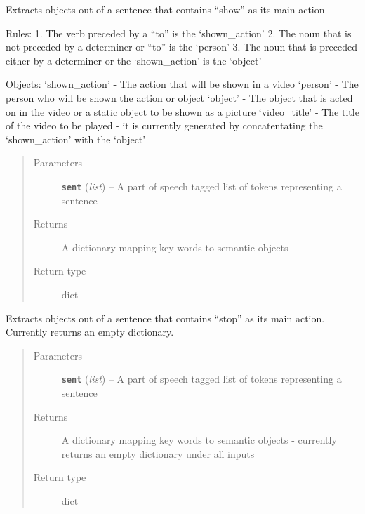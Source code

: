 \documentclass[letterpaper,10pt,english]{sphinxmanual}
\begin{document}
\begin{fulllineitems}
\label{extractor:interpreter.extractor.object_dict_show}
Extracts objects out of a sentence that contains ``show'' as its main action

Rules:
1. The verb preceded by a ``to'' is the `shown\_action'
2. The noun that is not preceded by a determiner or ``to'' is the `person'
3. The noun that is preceded either by a determiner or the `shown\_action' is the `object'

Objects:
`shown\_action' - The action that will be shown in a video
`person' - The person who will be shown the action or object
`object' - The object that is acted on in the video or a static object to be shown as a picture
`video\_title' - The title of the video to be played - it is currently generated by concatentating the `shown\_action' with the `object'
\begin{quote}\begin{description}
\item[{Parameters}] \leavevmode
\textbf{\texttt{sent}} (\emph{list}) -- A part of speech tagged list of tokens representing a sentence

\item[{Returns}] \leavevmode
A dictionary mapping key words to semantic objects

\item[{Return type}] \leavevmode
dict

\end{description}\end{quote}

\end{fulllineitems}


\begin{fulllineitems}
\label{extractor:interpreter.extractor.object_dict_stop}
Extracts objects out of a sentence that contains ``stop'' as its main action. Currently returns an empty dictionary.
\begin{quote}\begin{description}
\item[{Parameters}] \leavevmode
\textbf{\texttt{sent}} (\emph{list}) -- A part of speech tagged list of tokens representing a sentence

\item[{Returns}] \leavevmode
A dictionary mapping key words to semantic objects - currently returns an empty dictionary under all inputs

\item[{Return type}] \leavevmode
dict

\end{description}\end{quote}

\end{fulllineitems}
\end{document}
